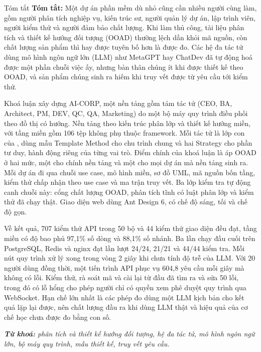\begin{preamble}{Tóm tắt}
\textbf{Tóm tắt:} Một dự án phần mềm dù nhỏ cũng cần nhiều người cùng làm, gồm người phân tích nghiệp vụ, kiến trúc sư, người quản lý dự án, lập trình viên, người kiểm thử và người đảm bảo chất lượng. Khi làm thủ công, tài liệu phân tích và thiết kế hướng đối tượng (OOAD) thường lệch dần khỏi mã nguồn, còn chất lượng sản phẩm thì hay được tuyên bố hơn là được đo. Các hệ đa tác tử dùng mô hình ngôn ngữ lớn (LLM) như MetaGPT hay ChatDev đã tự động hoá được một phần chuỗi việc ấy, nhưng bản thân chúng ít khi được thiết kế theo OOAD, và sản phẩm chúng sinh ra hiếm khi truy vết được từ yêu cầu tới kiểm thử.

Khoá luận xây dựng AI-CORP, một nền tảng gồm tám tác tử (CEO, BA, Architect, PM, DEV, QC, QA, Marketing) do một bộ máy quy trình điều phối theo đồ thị có hướng. Nền tảng theo kiến trúc phân lớp và thiết kế hướng miền, với tầng miền gồm 106 tệp không phụ thuộc framework. Mỗi tác tử là lớp con của , dùng mẫu Template Method cho chu trình chung và hai Strategy cho phần tư duy, hành động riêng của từng vai trò. Điểm chính của khoá luận là áp OOAD ở hai mức, một cho chính nền tảng và một cho mọi dự án mà nền tảng sinh ra. Mỗi dự án đi qua chuỗi use case, mô hình miền, sơ đồ UML, mã nguồn bốn tầng, kiểm thử chấp nhận theo use case và ma trận truy vết. Ba lớp kiểm tra tự động canh chuỗi này: cổng chất lượng OOAD, phân tích tĩnh có luật phân lớp và kiểm thử đã chạy thật. Giao diện web dùng Ant Design 6, có chế độ sáng, tối và chế độ gọn.

Về kết quả, 707 kiểm thử API trong 50 bộ và 44 kiểm thử giao diện đều đạt, tầng miền có độ bao phủ 97,1\% số dòng và 88,1\% số nhánh. Ba lần chạy đầu cuối trên PostgreSQL, Redis và nginx đạt lần lượt 24/24, 21/21 và 44/44 kiểm tra. Mỗi nút quy trình xử lý xong trong vòng 2 giây khi chưa tính độ trễ của LLM. Với 20 người dùng đồng thời, một tiến trình API phục vụ 604,8 yêu cầu mỗi giây mà không có lỗi. Kiểm thử, rà soát mã và cài lại từ đầu đã tìm ra và sửa 50 lỗi, trong đó có lỗ hổng cho phép người chỉ có quyền xem phê duyệt quy trình qua WebSocket. Hạn chế lớn nhất là các phép đo dùng một LLM kịch bản cho kết quả lặp lại được, nên chất lượng đầu ra khi dùng LLM thật và hiệu quả của cơ chế học chưa được đo bằng con số.

\vspace{0.5cm}
\textit{\textbf{Từ khoá:} phân tích và thiết kế hướng đối tượng, hệ đa tác tử, mô hình ngôn ngữ lớn, bộ máy quy trình, mẫu thiết kế, truy vết yêu cầu.}
\end{preamble}


